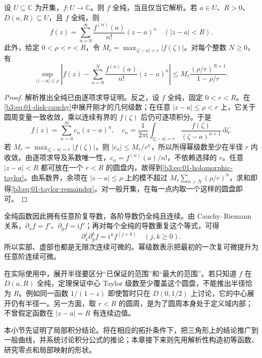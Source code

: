 \begin{theorem}[全纯与解析的等价性]\label{b3:thm:01-holomorphic-analytic}
设 \(U\subseteq\mathbb C\) 为开集，\(f:U\to\mathbb C\)。则 \(f\) 全纯，当且仅当它解析。若 \(a\in U\)、\(R>0\)、\(D(a,R)\subseteq U\)，且 \(f\) 全纯，则
\begin{equation}\label{b3:eq:01-holomorphic-taylor}
f(z)=\sum_{n=0}^\infty\frac{f^{(n)}(a)}{n!}(z-a)^n
\quad(|z-a|<R).
\end{equation}
此外，给定 \(0<\rho<r<R\)，令 \(M_r=\max_{|\zeta-a|=r}|f(\zeta)|\)。对每个整数 \(N\ge0\)，有
\begin{equation}\label{b3:eq:01-taylor-remainder}
 \sup_{|z-a|\le\rho}
 \left|f(z)-\sum_{n=0}^{N}\frac{f^{(n)}(a)}{n!}(z-a)^n\right|
 \le M_r\frac{(\rho/r)^{N+1}}{1-\rho/r}.
\end{equation}
\end{theorem}
\begin{proof}
解析推出全纯已由逐项求导证明。反之，设 \(f\) 全纯，固定 \(0<r<R\)。在\eqref{b3:eq:01-disk-cauchy}中展开刚才的几何级数；在任意 \(|z-a|\leq\rho<r\) 上，它关于圆周变量一致收敛，乘以连续有界的 \(f(\zeta)\) 后仍可逐项积分。于是
\[
f(z)=\sum_{n=0}^\infty c_n(z-a)^n,
\quad c_n=\frac1{2\pi\mathrm{i}}\int_{|\zeta-a|=r}
\frac{f(\zeta)}{(\zeta-a)^{n+1}}\,\mathrm{d}\zeta.
\]
若 \(M_r=\max_{|\zeta-a|=r}|f(\zeta)|\)，则 \(|c_n|\leq M_r/r^n\)，所以所得幂级数至少在半径 \(r\) 内收敛。由逐项求导及系数唯一性，\(c_n=f^{(n)}(a)/n!\)，不依赖选择的 \(r\)。任意 \(|z-a|<R\) 都可放在一个 \(r<R\) 的圆盘内，故得到\eqref{b3:eq:01-holomorphic-taylor}。由系数界，余项在 \(|z-a|\le\rho\) 上的模不超过 \(M_r\sum_{n>N}(\rho/r)^n\)，求和即得\eqref{b3:eq:01-taylor-remainder}。对一般开集，在每一点内取一个这样的圆盘即可。
\end{proof}

全纯函数因此拥有任意阶复导数，各阶导数仍全纯且连续。由 Cauchy--Riemann 关系，\(\partial_x f=f'\)、\(\partial_y f=\mathrm{i}f'\)；再对每个全纯的导数重复这个等式，可得
\[
 \partial_x^j\partial_y^k f=\mathrm{i}^{\,k}f^{(j+k)}
 \quad(j,k\ge0).
\]
所以实部、虚部也都是无限次连续可微的。幂级数表示把最初的一次复可微提升为任意阶连续可微。

\ProseParagraphBreak

在实际使用中，展开半径要区分“已保证的范围”和“最大的范围”。若只知道 \(f\) 在 \(D(a,R)\) 全纯，定理保证中心 Taylor 级数至少覆盖这个圆盘，不能推出半径恰为 \(R\)。例如同一函数 \(1/(1-z)\) 即使暂时只在 \(D(0,1/2)\) 上讨论，它的中心展开仍有半径一。另一方面，取 \(r<R\) 的圆周，是为了圆周本身处于定义域内部；不曾假定函数在 \(|z-a|=R\) 有连续边值。

\ProseParagraphBreak

本小节先证明了局部积分结论。将在相应的拓扑条件下，把三角形上的结论推广到一般曲线，并系统讨论积分公式的推论；本章接下来则先用解析性构造初等函数、研究零点和局部映射的形状。
